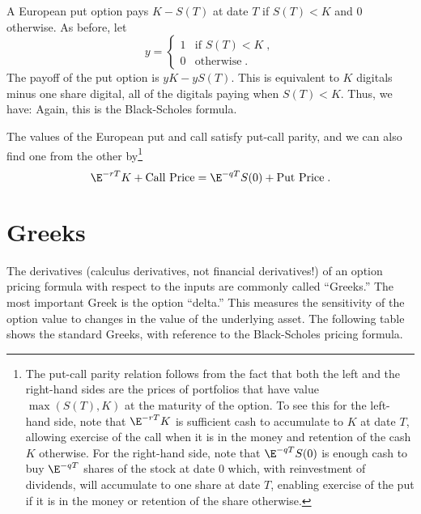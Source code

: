 A European put option pays $K-S(T)$ at date $T$ if $S(T)<K$ and 0 otherwise.  As before, let
\begin{equation*}
y =  \begin{cases} 1 & \text{if $S(T)<K$}\; ,\\
0 & \text{otherwise}\;.
\end{cases}
\end{equation*}
The payoff of the put option is $yK-yS(T)$.  This is equivalent to $K$ digitals minus one  share digital, all of the digitals paying when $S(T)<K$.  Thus, we have:
Again, this is the Black-Scholes formula.

The values of the European put and call satisfy put-call parity,  and we can also find one from the other by\footnote{The put-call parity relation follows from the fact that both the left and the right-hand sides are the prices of portfolios that have value $\max(S(T),K)$ at the maturity of the option.  To see this for the left-hand side, note that $\E^{-rT}K$ is sufficient cash to accumulate to $K$ at date $T$, allowing exercise of the call when it is in the money and retention of the cash $K$ otherwise.  For the right-hand side, note that $\E^{-q T}S(0)$ is enough cash to buy $\E^{-q T}$ shares of the stock at date 0 which, with reinvestment of dividends, will accumulate to one share at date $T$, enabling exercise of the put if it is in the money or retention of the share otherwise.}
\begin{equation}\label{putcallparity11}
\E^{-rT}K + \text{Call Price} = \E^{-q T}S(0)+ \text{Put Price}\;.
\end{equation}





\section{Greeks}

The derivatives (calculus derivatives, not financial derivatives!) of an option pricing formula with respect to the inputs are commonly called ``Greeks.''   The most important Greek is  the option ``delta.''  This measures the sensitivity of the option value to changes in the value of the underlying asset.  The following table shows the standard Greeks, with reference to the Black-Scholes pricing formula.

